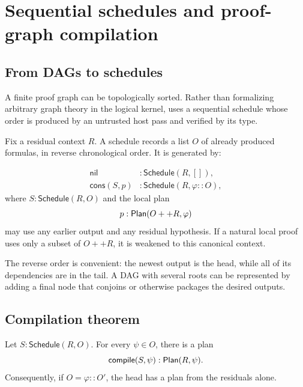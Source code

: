 \section{Sequential schedules and proof-graph compilation}\label{sec:schedule}

\subsection{From DAGs to schedules}

A finite proof graph can be topologically sorted.  Rather than formalizing arbitrary graph theory in
the logical kernel, \TAPIR{} uses a sequential schedule whose order is produced by an untrusted host
pass and verified by its type.

Fix a residual context \(R\).  A schedule records a list \(O\) of already produced formulas, in
reverse chronological order.  It is generated by:

\begin{align*}
  \mathsf{nil}&:\mathsf{Schedule}(R,[]),\\
  \mathsf{cons}(S,p)&:\mathsf{Schedule}(R,\varphi::O),
\end{align*}
where \(S:\mathsf{Schedule}(R,O)\) and the local plan
\[
  p:\mathsf{Plan}(O++R,\varphi)
\]
may use any earlier output and any residual hypothesis.  If a natural local proof uses only a subset
of \(O++R\), it is weakened to this canonical context.

The reverse order is convenient: the newest output is the head, while all of its dependencies are in
the tail.  A DAG with several roots can be represented by adding a final node that conjoins or
otherwise packages the desired outputs.

\subsection{Compilation theorem}

\begin{theorem}\label{thm:schedule-compile}
Let \(S:\mathsf{Schedule}(R,O)\).  For every \(\psi\in O\), there is a plan
\[
  \mathsf{compile}(S,\psi):\mathsf{Plan}(R,\psi).
\]
Consequently, if \(O=\varphi::O'\), the head has a plan from the residuals alone.
\end{theorem}


